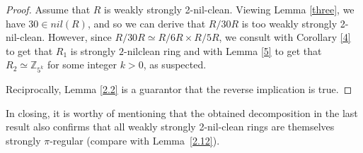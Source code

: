 \documentclass[12pt]{amsart}
\theoremstyle{definition}
\begin{document}
\begin{proof} Assume that $R$ is weakly strongly 2-nil-clean. Viewing Lemma \ref{three}, we have $30\in nil(R)$, and so we can derive that $R/30R$ is too weakly strongly 2-nil-clean. However, since $R/30R\simeq R/6R\times R/5R$, we consult with Corollary \ref{4} to get that $R_1$ is strongly $2$-nilclean ring and with Lemma \ref{5} to get that $R_2\simeq \mathbb{Z}_{5^k}$ for some integer $k>0$, as suspected.

Reciprocally, Lemma \ref{2.2} is a guarantor that the reverse implication is true.
\end{proof}

In closing, it is worthy of mentioning that the obtained decomposition in the last result also confirms that all weakly strongly 2-nil-clean rings are themselves strongly $\pi$-regular (compare with Lemma~\ref{2.12}).


\medskip


\vskip3.0pc
\end{document}
